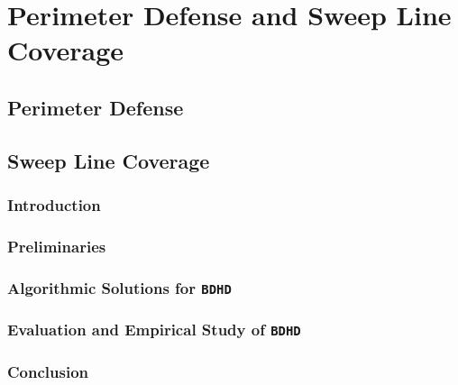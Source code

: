 
\chapter{Perimeter Defense and Sweep Line Coverage}
\thispagestyle{myheadings}
\section{Perimeter Defense}






\section{Sweep Line Coverage}

\def\prob{{\texttt{{BDHD}}}\xspace}
\def\ours{{{{EDP}}}\xspace}
\def\oours{{{{OEDP}}}\xspace}

\subsection{Introduction}
\label{sec:intro}
\subsection{Preliminaries}\label{sec:preliminary}

\label{sec:structure}
\subsection{Algorithmic Solutions for \prob}\label{sec:algorithm}

\subsection{Evaluation and Empirical Study of \prob}\label{sec:evaluation}

\subsection{Conclusion}\label{sec:conclusion}
